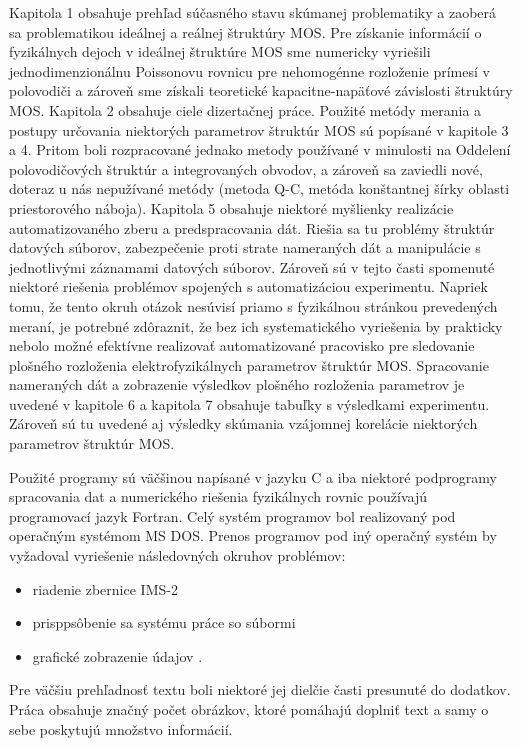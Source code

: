 \par Kapitola 1 obsahuje prehľad súčasného stavu skúmanej problematiky
a zaoberá sa problematikou ideálnej a reálnej štruktúry MOS. Pre
získanie informácií o fyzikálnych dejoch v ideálnej štruktúre MOS sme
numericky vyriešili jednodimenzionálnu Poissonovu rovnicu pre
nehomogénne rozloženie prímesí v polovodiči a zároveň sme získali
teoretické kapacitne-napäťové závislosti štruktúry MOS. Kapitola 2
obsahuje ciele dizertačnej práce. Použité metódy merania a postupy
určovania niektorých parametrov štruktúr MOS sú popísané v kapitole 3
a 4. Pritom boli rozpracované jednako metody používané v minulosti na
Oddelení polovodičových štruktúr a integrovaných obvodov, a zároveň sa
zaviedli nové, doteraz u nás nepužívané metódy (metoda Q-C, metóda
konštantnej šírky oblasti priestorového náboja). Kapitola 5 obsahuje
niektoré myšlienky realizácie automatizovaného zberu a predspracovania
dát. Riešia sa tu problémy štruktúr datových súborov, zabezpečenie
proti strate nameraných dát a manipulácie s jednotlivými záznamami
datových súborov. Zároveň sú v tejto časti spomenuté niektoré riešenia
problémov spojených s automatizáciou experimentu. Napriek tomu, že
tento okruh otázok nesúvisí priamo s fyzikálnou stránkou prevedených
meraní, je potrebné zdôraznit, že bez ich systematického vyriešenia by
prakticky nebolo možné efektívne realizovať automatizované pracovisko
pre sledovanie plošného rozloženia elektrofyzikálnych parametrov
štruktúr MOS. Spracovanie nameraných dát a zobrazenie výsledkov
plošného rozloženia parametrov je uvedené v kapitole 6 a kapitola 7
obsahuje tabuľky s výsledkami experimentu. Zároveň sú tu uvedené aj
výsledky skúmania vzájomnej korelácie niektorých parametrov štruktúr
MOS.

\par Použité programy sú väčšinou napísané v jazyku C a iba niektoré
podprogramy spracovania dat a numerického riešenia fyzikálnych rovnic
používajú programovací jazyk Fortran. Celý systém programov bol
realizovaný pod operačným systémom MS DOS. Prenos programov pod iný
operačný systém by vyžadoval vyriešenie následovných okruhov
problémov:
\begin{itemize}
\item{riadenie zbernice IMS-2}
\item{prisppsôbenie sa systému práce so súbormi}
\item{grafické zobrazenie údajov} .
\end{itemize}

\par Pre väčšiu prehľadnosť textu boli niektoré jej dielčie časti
presunuté do dodatkov.  Práca obsahuje značný počet obrázkov, ktoré
pomáhajú doplniť text a samy o sebe poskytujú množstvo informácií.


